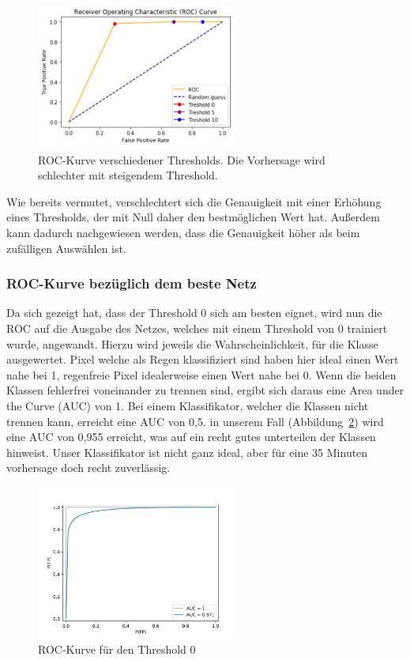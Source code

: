 \begin{figure}[H]
	\centering
	\includegraphics[width=0.6\textwidth]{pics/roc}
	\caption[ROC-Kurve verschiedener Thresholds]{ROC-Kurve verschiedener Thresholds. Die Vorhersage wird schlechter mit steigendem Threshold.}
	\label{roc}
\end{figure}

Wie bereits vermutet, verschlechtert sich die Genauigkeit mit einer Erhöhung eines Thresholds, der mit Null daher den bestmöglichen Wert hat.
Außerdem kann dadurch nachgewiesen werden, dass die Genauigkeit höher als beim zufälligen Auswählen ist.

\subsubsection{ROC-Kurve bezüglich dem beste Netz}
Da sich gezeigt hat, dass der Threshold 0 sich am besten eignet, wird nun die ROC auf die Ausgabe des Netzes, welches mit einem Threshold von 0 trainiert wurde, angewandt. Hierzu wird jeweils die Wahrscheinlichkeit, für die Klasse  ausgewertet. Pixel welche als Regen klassifiziert sind haben hier ideal einen Wert nahe bei 1, regenfreie Pixel idealerweise einen Wert nahe bei 0. Wenn die beiden Klassen fehlerfrei voneinander zu trennen sind, ergibt sich daraus eine Area under the Curve (AUC) von 1. Bei einem Klassifikator, welcher die Klassen nicht trennen kann, erreicht eine AUC von 0,5. in unserem Fall (Abbildung~\ref{roc2}) wird eine AUC von 0,955 erreicht, was auf ein recht gutes unterteilen der Klassen hinweist. Unser Klassifikator ist nicht ganz ideal, aber für eine 35 Minuten vorhersage doch recht zuverlässig.

\begin{figure}[ht]
	\centering
	\includegraphics[width=0.6\textwidth]{pics/ROC-curve.pdf}
	\caption{ROC-Kurve für den Threshold 0}
	\label{roc2}
\end{figure}



